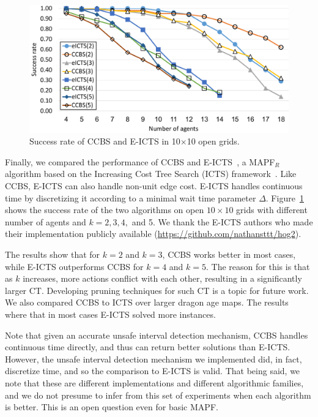\documentclass[review]{elsarticle}
\newcommand{\ccbs}{\ac{CCBS}\xspace}
\newcommand{\ct}{\ac{CT}\xspace}
\newcommand{\mapfr}{\ac{MAPF}$_R$\xspace}
\newcommand{\mapf}{\ac{MAPF}\xspace}
\begin{document}
\begin{figure}
    \centering
    \includegraphics[width=0.85\columnwidth]{ccbsVsICTS_cropped.pdf}
    \caption{Success rate of \ccbs and E-ICTS in 10$\times$10 open grids.}
    \label{fig:ccbs-vs-eicts}
    \vspace{-0.3cm}
\end{figure}


Finally, we compared the performance of \ccbs and E-ICTS~\cite{walker2018extended}, a \mapfr algorithm based on the Increasing Cost Tree Search (ICTS) framework~\cite{sharon2013increasing}. Like \ccbs, E-ICTS 
can also handle non-unit edge cost. 
E-ICTS handles continuous time by discretizing it according to a minimal wait time parameter $\Delta$. 
Figure~\ref{fig:ccbs-vs-eicts} shows the success rate of the two algorithms on open $10\times10$ grids with different number of agents and $k=2, 3, 4,$ and 5. 
We thank the E-ICTS authors who made their implementation publicly available (\url{https://github.com/nathansttt/hog2}). 


The results show that for $k=2$ and $k=3$, \ccbs works better in most cases, while E-ICTS outperforms \ccbs for $k=4$ and $k=5$. The reason for this is that as $k$ increases, more actions conflict with each other, resulting in a significantly larger \ct. Developing pruning techniques for such \ct is a topic for future work. We also compared \ccbs to ICTS over larger dragon age maps. The results where that in most cases E-ICTS solved more instances. 


Note that given an accurate unsafe interval detection mechanism, \ccbs handles continuous time directly, and thus can return better solutions than E-ICTS. However, the unsafe interval detection mechanism we implemented did, in fact, discretize time, and so the comparison to E-ICTS is valid. That being said, we note that these are different implementations and different algorithmic families, and we do not presume to infer from this set of experiments when each algorithm is better. This is an open question even for basic \mapf.  
\end{document}
